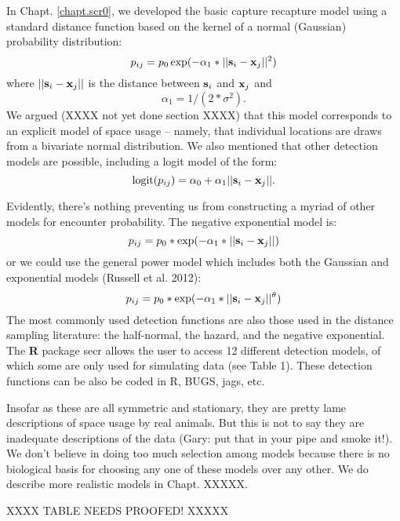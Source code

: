 In Chapt. \ref{chapt.scr0}, we developed the basic capture recapture model using  a
standard distance function based on the kernel of a normal (Gaussian) probability
distribution:
\[
p_{ij} = p_{0} \exp(-\alpha_{1} *||{\bf s}_{i}-{\bf x}_{j}||^2)
\]
where $||{\bf s}_{i}-{\bf x}_{j}||$ is the distance between ${\bf
  s}_{i}$ and ${\bf x}_{j}$ and
\[
\alpha_{1} = 1/(2*\sigma^2).
\]
We argued (XXXX not yet done section XXXX) that this model 
corresponds to an explicit model of space usage -- namely, that
individual locations are draws from a bivariate normal
distribution. We also mentioned that other detection models are
possible, including a logit model of the form:
\begin{equation}
	\mbox{logit}(p_{ij}) = \alpha_{0} + \alpha_1 ||{\bf s}_{i}-{\bf x}_{j} ||.
\label{covariates.eq.logit}
\end{equation}

Evidently, there's nothing preventing us from constructing a myriad of
other models for encounter probability.
The negative exponential model is:
\[
p_{ij} = p_{0}*\exp(-\alpha_{1} *||{\bf s}_{i}-{\bf x}_{j}||)
\]
or we could use the general power model which includes both the
Gaussian and exponential models (Russell et al. 2012):
\[
p_{ij} = p_{0}*\exp(-\alpha_{1} *||{\bf s}_{i}-{\bf x}_{j}||^{\theta} )
\]
The most commonly used detection
functions are also those used in the distance sampling literature: the
half-normal, the hazard, and the negative exponential.  
The {\bf R} package
secr allows the user to access 12 different detection models, of which
some are only used for simulating data (see Table 1).  These detection
functions can be also be coded in R, BUGS, jags, etc.  

Insofar as these are all symmetric and stationary, they are pretty
lame descriptions of space usage by real animals. But this is not to
say they are inadequate descriptions of the data (Gary: put that in
your pipe and smoke it!).  We don't believe in doing too much
selection among models because there is no biological basis for
choosing any one of these models over any other. We do describe more
realistic models in Chapt. XXXXX.



XXXX TABLE NEEDS PROOFED! XXXXX

